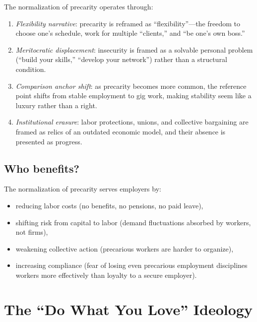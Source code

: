 \begin{model}
\label{mod:precarity}
The normalization of precarity operates through:
\begin{enumerate}[nosep]
  \item \emph{Flexibility narrative}: precarity is reframed as ``flexibility''---the freedom to choose one's schedule, work for multiple ``clients,'' and ``be one's own boss.''
  \item \emph{Meritocratic displacement}: insecurity is framed as a solvable personal problem (``build your skills,'' ``develop your network'') rather than a structural condition.
  \item \emph{Comparison anchor shift}: as precarity becomes more common, the reference point shifts from stable employment to gig work, making stability seem like a luxury rather than a right.
  \item \emph{Institutional erasure}: labor protections, unions, and collective bargaining are framed as relics of an outdated economic model, and their absence is presented as progress.
\end{enumerate}
\end{model}

\subsection{Who benefits?}

The normalization of precarity serves employers by:
\begin{itemize}[nosep]
  \item reducing labor costs (no benefits, no pensions, no paid leave),
  \item shifting risk from capital to labor (demand fluctuations absorbed by workers, not firms),
  \item weakening collective action (precarious workers are harder to organize),
  \item increasing compliance (fear of losing even precarious employment disciplines workers more effectively than loyalty to a secure employer).
\end{itemize}

\section{The ``Do What You Love'' Ideology}
\label{sec:ch26-dwyl}

